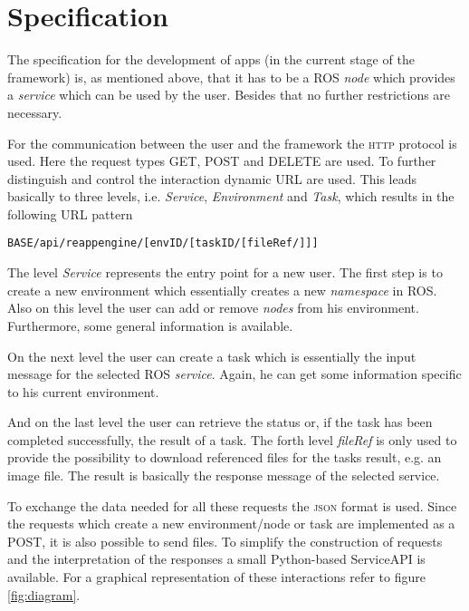 \documentclass[10pt,a4paper]{article}
\begin{document}
	\section*{Specification}
		The specification for the development of apps (in the current stage of the framework) is, as
		mentioned above, that it has to be a \textsc{ROS} \emph{node} which provides a
		\emph{service} which can be used by the user. Besides that no further restrictions are
		necessary.
		
		For the communication between the user and the framework the \textsc{http} protocol is used.
		Here the request types \textsc{GET}, \textsc{POST} and \textsc{DELETE} are used. To further
		distinguish and control the interaction dynamic URL are used. This leads basically to
		three levels, i.e. \emph{Service}, \emph{Environment} and \emph{Task}, which results in the
		following URL pattern
		\begin{lstlisting}
BASE/api/reappengine/[envID/[taskID/[fileRef/]]]
		\end{lstlisting}
		The level \emph{Service} represents the entry point for a new user. The first step is to
		create a new environment which essentially creates a new \emph{namespace} in \textsc{ROS}.
		Also on this level the user can add or remove \emph{nodes} from his environment.
		Furthermore, some general information is available.
		
		On the next level the user can create a task which is essentially the input message for
		the selected \textsc{ROS} \emph{service}. Again, he can get some information specific to
		his current environment.
		
		And on the last level the user can retrieve the status or, if the task has been completed
		successfully, the result of a task. The forth level \emph{fileRef} is only used to provide
		the possibility to download referenced files for the tasks result, e.g. an image file. The
		result is basically the response message of the selected service.
		
		To exchange the data needed for all these requests the \textsc{json} format is used. Since
		the requests which create a new environment/node or task are implemented as a
		\textsc{POST}, it is also possible to send files. To simplify the construction of requests and
		the interpretation of the responses a small Python-based ServiceAPI is available. For a graphical
		representation of these interactions refer to figure \ref{fig:diagram}. 
		
\end{document}
